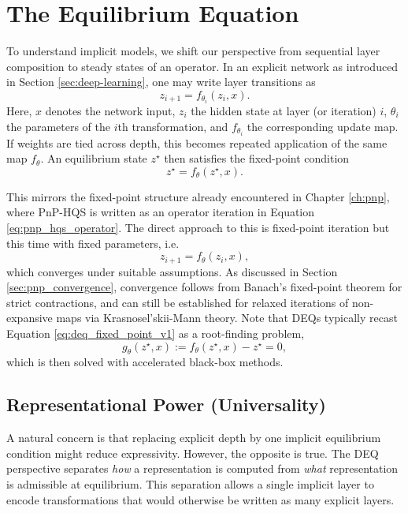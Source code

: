 \section{The Equilibrium Equation}
To understand implicit models, we shift our perspective from sequential layer composition to steady states of an operator. In an explicit network as introduced in Section \ref{sec:deep-learning}, one may write layer transitions as
\begin{equation}
    z_{i+1} = f_{\theta_i}(z_i, x).
    \label{eq:deq-fp-v1}
\end{equation}
Here, $x$ denotes the network input, $z_i$ the hidden state at layer (or iteration) $i$, $\theta_i$ the parameters of the $i$th transformation, and $f_{\theta_i}$ the corresponding update map. If weights are tied across depth, this becomes repeated application of the same map $f_\theta$. An equilibrium state $z^\star$ then satisfies the fixed-point condition
\begin{equation}
    z^\star = f_\theta(z^\star, x).
    \label{eq:deq_fixed_point_v1}
\end{equation}

This mirrors the fixed-point structure already encountered in Chapter \ref{ch:pnp}, where PnP-HQS is written as an operator iteration in Equation \eqref{eq:pnp_hqs_operator}. The direct approach to this is fixed-point iteration but this time with fixed parameters, i.e.
\begin{equation*}
    z_{i+1} = f_\theta(z_i, x),
\end{equation*}
which converges under suitable assumptions. As discussed in Section \ref{sec:pnp_convergence}, convergence follows from Banach's fixed-point theorem for strict contractions, and can still be established for relaxed iterations of non-expansive maps via Krasnosel'skii-Mann theory. Note that DEQs typically recast Equation \eqref{eq:deq_fixed_point_v1} as a root-finding problem,
\begin{equation}
    g_\theta(z^\star, x) := f_\theta(z^\star, x) - z^\star = 0,
    \label{eq:deq_root_v1}
\end{equation}
which is then solved with accelerated black-box methods.

\subsection{Representational Power (Universality)}
A natural concern is that replacing explicit depth by one implicit equilibrium condition might reduce expressivity. However, the opposite is true. The DEQ perspective separates \emph{how} a representation is computed from \emph{what} representation is admissible at equilibrium. This separation allows a single implicit layer to encode transformations that would otherwise be written as many explicit layers.

